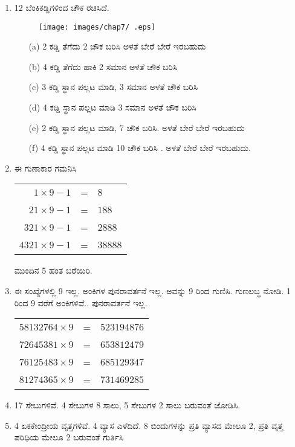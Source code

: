 \begin{enumerate}
\item 12 ಬೆಂಕಿಕಡ್ಡಿಗಳಿಂದ ಚೌಕ ರಚಿಸಿದೆ. 
\begin{figure}[!h]
\centering
\texttt{[image: images/chap7/ .eps]}
\end{figure}
\begin{itemize}
\item[(a)] 2 ಕಡ್ಡಿ ತೆಗೆದು 2 ಚೌಕ ಬರಿಸಿ ಅಳತೆ ಬೇರೆ ಬೇರೆ ಇರಬಹುದು 
\item[(b)] 4 ಕಡ್ಡಿ ತೆಗೆದು ಹಾಕಿ 2 ಸಮಾನ ಅಳತೆ ಚೌಕ ಬರಿಸಿ 
\item[(c)] 3 ಕಡ್ಡಿ ಸ್ಥಾನ ಪಲ್ಲಟ ಮಾಡಿ, 3 ಸಮಾನ ಅಳತೆ ಚೌಕ ಬರಿಸಿ 
\item[(d)] 4 ಕಡ್ಡಿ ಸ್ಥಾನ ಪಲ್ಲಟ ಮಾಡಿ 3 ಸಮಾನ ಅಳತೆ ಚೌಕ ಬರಿಸಿ 
\item[(e)] 2 ಕಡ್ಡಿ ಸ್ಥಾನ ಪಲ್ಲಟ ಮಾಡಿ, 7 ಚೌಕ ಬರಿಸಿ. ಅಳತೆ ಬೇರೆ ಬೇರೆ ಇರಬಹುದು 
\item[(f)] 4 ಕಡ್ಡಿ ಸ್ಥಾನ ಪಲ್ಲಟ ಮಾಡಿ 10 ಚೌಕ ಬರಿಸಿ . ಅಳತೆ ಬೇರೆ ಬೇರೆ ಇರಬಹುದು. 
\end{itemize}

\item ಈ ಗುಣಾಕಾರ ಗಮನಿಸಿ 

\begin{tabular}[t]{rcl}
$1\times 9 - 1$& = & $8$\\
$21\times 9 - 1$& = & $188$\\
$321\times 9 - 1$& = & $2888$\\
$4321\times 9 - 1$& = & $38888$\\
\end{tabular}

ಮುಂದಿನ 5 ಹಂತ ಬರೆಯಿರಿ. 

\item ಈ ಸಂಖ್ಯೆಗಳಲ್ಲಿ 9 ಇಲ್ಲ. ಅಂಕಿಗಳ ಪುನರಾವರ್ತನೆ ಇಲ್ಲ. ಅವನ್ನು 9 ರಿಂದ ಗುಣಿಸಿ. ಗುಣಲಬ್ಧ ನೋಡಿ. 1 ರಿಂದ 9 ವರೆಗೆ ಅಂಕಿಗಳಿವೆ.. ಪುನರಾವರ್ತನೆ ಇಲ್ಲ. 

\begin{tabular}[t]{lcl}
$58132764\times 9$ & = & $523194876$\\
$72645381\times 9$ & = & $653812479$\\
$76125483\times 9$ & = & $685129347$\\
$81274365\times 9$ & = & $731469285$
\end{tabular}

\item 17 ಸೇಬುಗಳಿವೆ. 4 ಸೇಬುಗಳ 8 ಸಾಲು, 5 ಸೇಬುಗಳ 2 ಸಾಲು ಬರುವಂತೆ ಜೋಡಿಸಿ. 

\item 4 ಏಕಕೇಂದ್ರೀಯ ವೃತ್ತಗಳಿವೆ. 4 ವ್ಯಾಸ ಎಳೆದಿದೆ. 8 ಬಿಂದುಗಳನ್ನು ಪ್ರತಿ ವ್ಯಾಸದ ಮೇಲೂ 2, ಪ್ರತಿ ವೃತ್ತ ಪರಿಧಿಯ ಮೇಲೂ 2 ಬರುವಂತೆ ಗುರ್ತಿಸಿ 


\end{enumerate}

